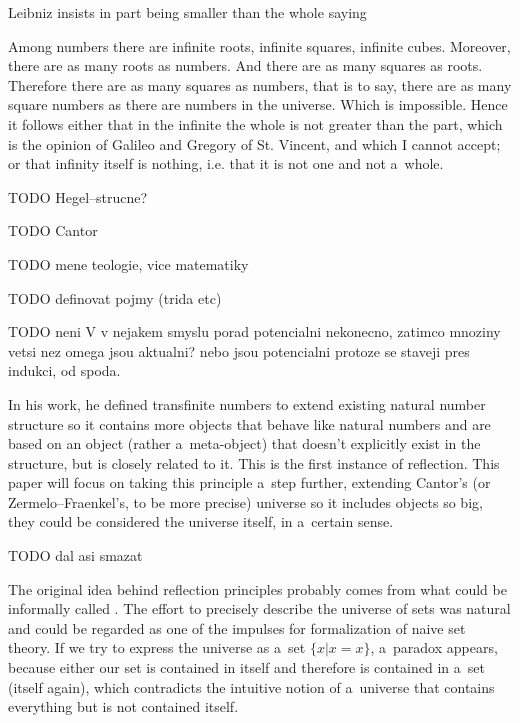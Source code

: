 \documentclass[12pt,a4paper]{article}
\begin{document}
Leibniz insists in part being smaller than the whole saying
\begin{displayquote}
Among numbers there are infinite roots, infinite squares, infinite cubes. Moreover, there are
as many roots as numbers. And there are as many squares as roots. Therefore there are as
many squares as numbers, that is to say, there are as many square numbers as there are
numbers in the universe. Which is impossible. Hence it follows either that in the infinite the
whole is not greater than the part, which is the opinion of Galileo and Gregory of St.
Vincent, and which I cannot accept; or that infinity itself is nothing, i.e. that it is not one and
not a~whole. %
\end{displayquote}

TODO  Hegel--strucne?

TODO Cantor

TODO mene teologie, vice matematiky

TODO definovat pojmy (trida etc)

TODO neni V v nejakem smyslu porad potencialni nekonecno, zatimco mnoziny vetsi nez omega jsou aktualni? nebo jsou potencialni protoze se staveji pres indukci, od spoda.

In his work, he defined transfinite numbers to extend existing natural number %
structure so it contains more objects that behave like natural numbers and are based on an object (rather a~meta-object) that doesn't explicitly exist in the structure, but is closely related to it. This is the first instance of reflection. 
This paper will focus on taking this principle a~step further, extending Cantor's (or Zermelo–Fraenkel's, to be more precise) universe so it includes objects so big, they could be considered the universe itself, in a~certain sense. %


TODO dal asi smazat


The original idea behind reflection principles probably comes from what could be informally called .
The effort to precisely describe the universe of sets was natural and could be regarded as one of the impulses for formalization of naive set theory.
If we try to express the universe as a~set $\{x  |  x = x\}$, a~paradox appears, because either our set is contained in itself and therefore is contained in a~set (itself again), which contradicts the intuitive notion of a~universe that contains everything but is not contained itself.
\end{document}
